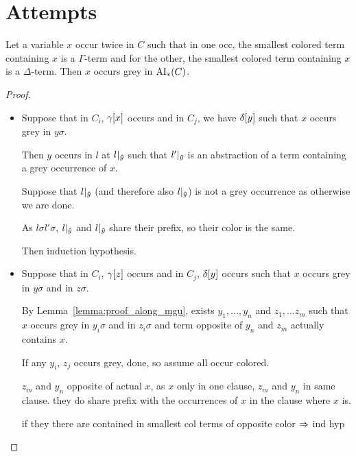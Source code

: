 \documentclass[,%
	paper=a4,%
	DIV11, %
	twoside=false,%
	liststotoc,
	bibtotoc,
	draft=false,%
	numbers=noendperiod
]{scrartcl}
\begin{document}
\clearpage

\section{Attempts}

\begin{clemma}
	\label{lemma:smallest_colored_container}
	Let a variable $x$ occur twice in $C$ such that in one occ, the smallest colored term containing $x$ is a $\Gamma$-term and for the other, the smallest colored term containing $x$ is a $\Delta$-term.
	Then $x$ occurs grey in $\operatorname{AI}_\mathrm{*}(C)$.
\end{clemma}
\begin{proof}
	~
	\begin{itemize}
		\item
			Suppose that in $C_i$, $\gamma[x]$ occurs and in $C_j$, we have $\delta[y]$ such that $x$ occurs grey in $y\sigma$.

			Then $y$ occurs in $l$ at $l|_{\bm\hat y}$ such that $l'|_{\bm\hat y}$ is an abstraction of a term containing a grey occurrence of $x$.

			Suppose that $l|_{\bm\hat y}$ (and therefore also $l|_{\bm\hat y}$) is not a grey occurrence as otherwise we are done. 

			As $l\sigma l'\sigma $, $l|_{\bm\hat y}$ and $l|_{\bm\hat y}$ share their prefix, so their color is the same.

			Then induction hypothesis.

		\item 
			Suppose that in $C_i$, $\gamma[z]$ occurs and in $C_j$, $\delta[y]$ occurs such that $x$ occurs grey in $y\sigma$ and in $z\sigma$.

			By Lemma~\ref{lemma:proof_along_mgu}, exists $y_1, \dots, y_n$ and $z_1, \dots z_m$ such that $x$ occurs grey in $y_i\sigma$ and in $z_i\sigma$ and term opposite of $y_n$ and $z_m$ actually contains $x$.


			If any $y_i$, $z_j$ occurs grey, done, so assume all occur colored.

			$z_m$ and $y_n$ opposite of actual $x$, as $x$ only in one clause, $z_m$ and $y_n$ in same clause. 
			they do share prefix with the occurrences of $x$ in the clause where $x$ is.

			if they there are contained in smallest col terms of opposite color $\Rightarrow$ ind hyp


\end{itemize}
\end{proof}
\end{document}
